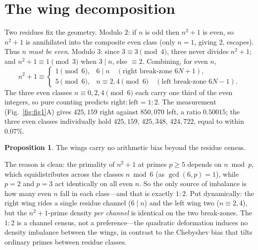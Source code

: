 \documentclass[11pt]{article}
\theoremstyle{definition}
\newtheorem{proposition}{Proposition}
\begin{document}
\section{The wing decomposition}
Two residues fix the geometry. Modulo $2$: if $n$ is odd then $n^2+1$ is even, so $n^2+1$ is
annihilated into the composite even class (only $n=1$, giving $2$, escapes). Thus $n$ \emph{must be
even}. Modulo $3$: since $3\equiv3\pmod4$, three never divides $n^2+1$; and $n^2+1\equiv1\pmod3$ when
$3\mid n$, else $\equiv2$. Combining, for even $n$,
\[
n^2+1\equiv
\begin{cases}
1\pmod6,& 6\mid n\quad(\text{right break-zone }6N{+}1),\\
5\pmod6,& n\equiv2,4\pmod6\quad(\text{left break-zone }6N{-}1).
\end{cases}
\]
The three even classes $n\equiv0,2,4\pmod6$ each carry one third of the even integers, so pure counting
predicts $\mathrm{right}:\mathrm{left}=1:2$. The measurement (Fig.~\ref{fig:fig1}A) gives $425{,}159$
right against $850{,}070$ left, a ratio $0.50015$; the three even classes individually hold
$425{,}159$, $425{,}348$, $424{,}722$, equal to within $0.07\%$.

\begin{proposition}
The wings carry no arithmetic bias beyond the residue census.
\end{proposition}
\noindent The reason is clean: the primality of $n^2+1$ at primes $p\ge5$ depends on $n\bmod p$, which
equidistributes across the classes $n\bmod6$ (as $\gcd(6,p)=1$), while $p=2$ and $p=3$ act identically
on all even $n$. So the only source of imbalance is how many even $n$ fall in each class---and that is
exactly $1{:}2$. Put dynamically: the right wing rides a single residue channel ($6\mid n$) and the
left wing two ($n\equiv2,4$), but the $n^2+1$-prime density \emph{per channel} is identical on the two
break-zones. The $1{:}2$ is a channel census, not a preference---the quadratic deformation induces no
density imbalance between the wings, in contrast to the Chebyshev bias that tilts ordinary primes
between residue classes.
\end{document}
